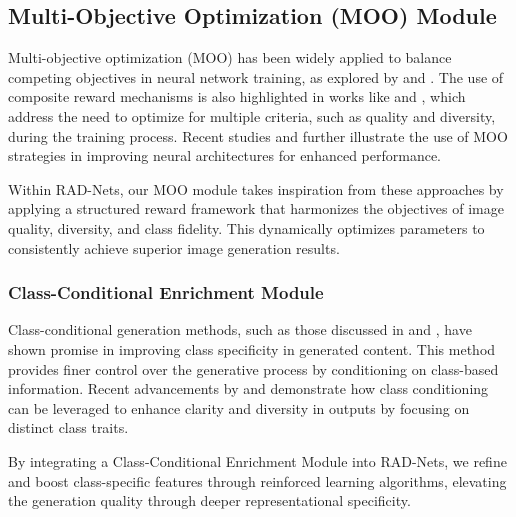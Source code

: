 \subsection{Multi-Objective Optimization (MOO) Module}

Multi-objective optimization (MOO) has been widely applied to balance competing objectives in neural network training, as explored by \cite{kim2005multi} and \cite{deb2002fast}. The use of composite reward mechanisms is also highlighted in works like \cite{van2016deep} and \cite{anderson2018deep}, which address the need to optimize for multiple criteria, such as quality and diversity, during the training process. Recent studies \cite{tan2019efficientnet} and \cite{liu2018progressive} further illustrate the use of MOO strategies in improving neural architectures for enhanced performance.

Within RAD-Nets, our MOO module takes inspiration from these approaches by applying a structured reward framework that harmonizes the objectives of image quality, diversity, and class fidelity. This dynamically optimizes parameters to consistently achieve superior image generation results.

\subsubsection{Class-Conditional Enrichment Module}

Class-conditional generation methods, such as those discussed in \cite{brock2018large} and \cite{mirza2014conditional}, have shown promise in improving class specificity in generated content. This method provides finer control over the generative process by conditioning on class-based information. Recent advancements by \cite{karras2019style} and \cite{odena2017conditional} demonstrate how class conditioning can be leveraged to enhance clarity and diversity in outputs by focusing on distinct class traits.

By integrating a Class-Conditional Enrichment Module into RAD-Nets, we refine and boost class-specific features through reinforced learning algorithms, elevating the generation quality through deeper representational specificity.


